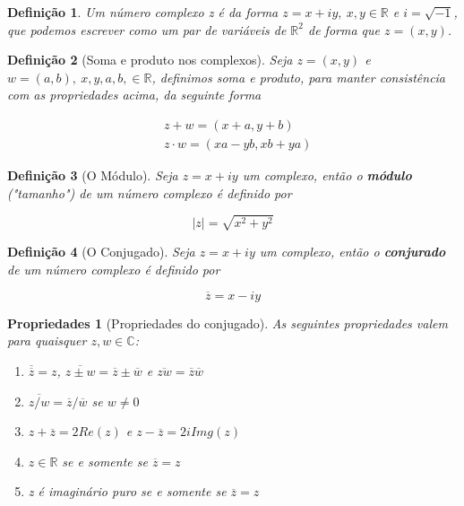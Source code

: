 \documentclass{article}
\newtheorem{prop}{Propriedades}
\newtheorem{definition}{Definição}
\begin{document}
\begin{definition}
Um número complexo z é da forma $z = x + iy, \ x,y \in \mathbb{R}$ e $i = \sqrt{-1}$, que podemos escrever como um par de variáveis de $\mathbb{R}^2$ de forma que $z = (x, y)$.
\end{definition}

\begin{definition}[Soma e produto nos complexos]
Seja $z = (x, y)$ e $w = (a, b),\ x,y,a,b, \in \mathbb{R}$, definimos soma e produto, para manter consistência com as propriedades acima, da seguinte forma

\begin{align}
    &z + w = (x + a, y + b) \nonumber \\
    &z \cdot w = (xa - yb, xb + ya) \nonumber
\end{align}
\end{definition}

\begin{definition}[O Módulo]
Seja $z = x + iy$ um complexo, então o \textbf{módulo} ("tamanho") de um número complexo é definido por

$$\mid z \mid = \sqrt{x^2 + y^2}$$
\end{definition}

\begin{definition}[O Conjugado]
Seja $z = x + iy$ um complexo, então o \textbf{conjurado} de um número complexo é definido por

$$\overline{z} = x - i y$$
\end{definition}

\begin{prop}[Propriedades do conjugado] As seguintes propriedades valem para quaisquer $z, w \in \mathbb{C}$:

\begin{enumerate}[label=(\alph*)]
    \item $\overline{\overline{z}} = z$, $\overline{z \pm w} = \overline{z} \pm \overline{w}$ e $\overline{z w} = \overline{z} \overline{w}$
    
    \item $\overline{z/w} = \overline{z}/\overline{w}$ se $w \neq 0$
    
    \item $z + \overline{z} = 2 Re(z)$ e $z - \overline{z} = 2i Img(z)$
    
    \item $z \in \mathbb{R}$ se e somente se $\overline{z} = z$
    
    \item z é imaginário puro se e somente se $\overline{z} = z$
\end{enumerate}
\end{prop}
\end{document}
